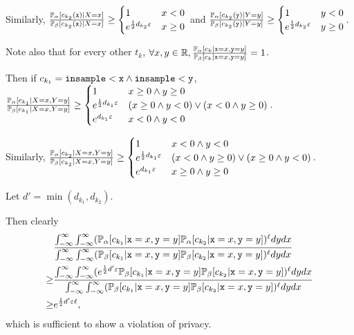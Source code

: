 Similarly, $\frac{\PP_\alpha[c_{k_2}(\texttt{x})|X = x]}{\PP_\beta[c_{k_2}(\texttt{x})|X = x]}\geq \begin{cases}
	1 & x < 0\\
	e^{\frac{1}{2}d_{k_2}\varepsilon} & x\geq 0
\end{cases}$ and $\frac{\PP_\alpha[c_{k_2}(\texttt{y})|Y = y]}{\PP_\beta[c_{k_2}(\texttt{y})| Y= y]}\geq \begin{cases}
	1 & y < 0\\
	e^{\frac{1}{2}d_{k_2}\varepsilon} & y\geq 0
\end{cases}$. 

Note also that for every other $t_k$, $\forall x, y\in \RR, \frac{\PP_\alpha[c_k|\texttt{x}=x, \texttt{y}=y]}{\PP_\beta[c_k|\texttt{x}=x, \texttt{y}=y]}=1$.


Then if $c_{k_1} =\lguard[\texttt{x}]\land \lguard[\texttt{y}]$,  $\frac{\PP_\alpha[c_{k_1}|X = x, Y=y]}{\PP_\beta[c_{k_1}|X = x, Y=y]}\geq \begin{cases}
	1 & x \geq 0\land y\geq 0\\
	e^{\frac{1}{2}d_{k_1}\varepsilon} & (x \geq 0\land y< 0)\lor(x < 0\land y\geq 0) \\
	e^{d_{k_1}\varepsilon} & x< 0\land y<0
\end{cases}$. 

Similarly, $\frac{\PP_\alpha[c_{k_2}|X = x, Y=y]}{\PP_\beta[c_{k_2}|X = x, Y=y]}\geq \begin{cases}
	1 & x <0\land y<0\\
	e^{\frac{1}{2}d_{k_1}\varepsilon} & (x < 0\land y\geq 0)\lor (x \geq 0\land y< 0) \\
	e^{d_{k_1}\varepsilon} & x\geq  0\land y\geq 0
\end{cases}$.

Let $d' = \min(d_{k_1}, d_{k_2})$.

Then clearly \begin{align*}
	&\frac{\int_{-\infty}^\infty\int_{-\infty}^\infty(\PP_\alpha[c_{k_1}|\texttt{x}=x, \texttt{y}=y]\PP_\alpha[c_{k_2}|\texttt{x}=x, \texttt{y}=y])^\ell dydx}{\int_{-\infty}^\infty\int_{-\infty}^\infty(\PP_\beta[c_{k_1}|\texttt{x}=x, \texttt{y}=y]\PP_\beta[c_{k_2}|\texttt{x}=x, \texttt{y}=y])^\ell dydx}\\
	\geq &\frac{\int_{-\infty}^\infty\int_{-\infty}^\infty(e^{\frac{1}{2}d'\varepsilon}\PP_\beta[c_{k_1}|\texttt{x}=x, \texttt{y}=y]\PP_\beta[c_{k_2}|\texttt{x}=x, \texttt{y}=y])^\ell dydx}{\int_{-\infty}^\infty\int_{-\infty}^\infty(\PP_\beta[c_{k_1}|\texttt{x}=x, \texttt{y}=y]\PP_\beta[c_{k_2}|\texttt{x}=x, \texttt{y}=y])^\ell dydx} \\
	\geq & e^{\frac{1}{2}d'\varepsilon\ell},
\end{align*}
which is sufficient to show a violation of privacy. 

